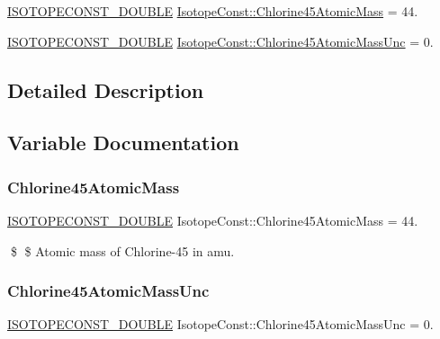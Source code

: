 \begin{DoxyCompactItemize}
\item 
\mbox{\hyperlink{group___isotope_const-_macros_ga8f45a7272ce02c0b4c65c44636ed719a}{I\+S\+O\+T\+O\+P\+E\+C\+O\+N\+S\+T\+\_\+\+D\+O\+U\+B\+LE}} \mbox{\hyperlink{group___isotope_const-_chlorine-_cl45_gabd41a51403d67893b468946525a7346f}{Isotope\+Const\+::\+Chlorine45\+Atomic\+Mass}} = 44.
\item 
\mbox{\hyperlink{group___isotope_const-_macros_ga8f45a7272ce02c0b4c65c44636ed719a}{I\+S\+O\+T\+O\+P\+E\+C\+O\+N\+S\+T\+\_\+\+D\+O\+U\+B\+LE}} \mbox{\hyperlink{group___isotope_const-_chlorine-_cl45_ga4e9faa894091e9d1f81a5ee08f7fd6b4}{Isotope\+Const\+::\+Chlorine45\+Atomic\+Mass\+Unc}} = 0.
\end{DoxyCompactItemize}


\subsection{Detailed Description}


\subsection{Variable Documentation}
\mbox{\label{group___isotope_const-_chlorine-_cl45_gabd41a51403d67893b468946525a7346f}} 
\subsubsection{\texorpdfstring{Chlorine45\+Atomic\+Mass}{Chlorine45AtomicMass}}
{\footnotesize\ttfamily \mbox{\hyperlink{group___isotope_const-_macros_ga8f45a7272ce02c0b4c65c44636ed719a}{I\+S\+O\+T\+O\+P\+E\+C\+O\+N\+S\+T\+\_\+\+D\+O\+U\+B\+LE}} Isotope\+Const\+::\+Chlorine45\+Atomic\+Mass = 44.}

\$ \$ Atomic mass of Chlorine-\/45 in amu. \mbox{\label{group___isotope_const-_chlorine-_cl45_ga4e9faa894091e9d1f81a5ee08f7fd6b4}} 
\subsubsection{\texorpdfstring{Chlorine45\+Atomic\+Mass\+Unc}{Chlorine45AtomicMassUnc}}
{\footnotesize\ttfamily \mbox{\hyperlink{group___isotope_const-_macros_ga8f45a7272ce02c0b4c65c44636ed719a}{I\+S\+O\+T\+O\+P\+E\+C\+O\+N\+S\+T\+\_\+\+D\+O\+U\+B\+LE}} Isotope\+Const\+::\+Chlorine45\+Atomic\+Mass\+Unc = 0.}

